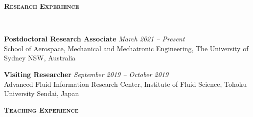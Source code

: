 \documentclass[letterpaper, 10pt]{article}
\newenvironment{changemargin}[2]{%
  \begin{list}{}{%
      \setlength{\topsep}{0pt}%
      \setlength{\leftmargin}{#1}%
      \setlength{\rightmargin}{#2}%
      \setlength{\listparindent}{\parindent}%
      \setlength{\itemindent}{\parindent}%
      \setlength{\parsep}{\parskip}%
    }%
  \item[]}{\end{list}
}
\newcommand{\lineover}{
  \begin{changemargin}{-0.05in}{-0.05in}
    \vspace*{-8pt}
    \hrulefill \\
    \vspace*{-2pt}
  \end{changemargin}
}
\newcommand{\header}[1]{
  \begin{changemargin}{-0.5in}{-0.5in}
    \textbf{\scshape{#1}}\\
    \lineover
  \end{changemargin}
}
\newenvironment{body} {
  \vspace*{-16pt}
  \begin{changemargin}{-0.25in}{-0.5in}
  }
  {\end{changemargin}
}
\begin{document}
\header{Research Experience}
\begin{body}
	\vspace{14pt}
	\textbf{Postdoctoral Research Associate}\hfill
	\emph{March 2021 -- Present} \\
	School of Aerospace, Mechanical and Mechatronic Engineering, The University of Sydney   \hfill NSW, Australia
	\vspace{-2pt}
	
	\vspace{14pt}
	\textbf{Visiting Researcher}\hfill
	\emph{September 2019 -- October 2019} \\
	Advanced Fluid Information Research Center, Institute of Fluid Science, Tohoku University   \hfill Sendai, Japan
	\vspace{-2pt}
	
	
\end{body}
\smallskip
\header{Teaching Experience}
\end{document}
